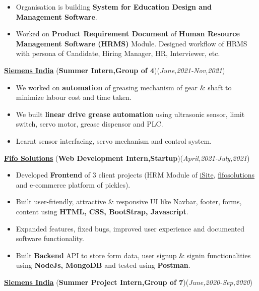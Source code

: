 \documentclass[10pt]{extarticle}
\begin{document}
    \begin{itemize}
       \item Organisation is building \textbf{System for Education Design and Management Software}. 
       \item Worked on \textbf{Product Requirement Document} of \textbf{Human Resource Management Software (HRMS)} Module. Designed workflow of HRMS with persona of Candidate, Hiring Manager, HR, Interviewer, etc.
    \end{itemize}
\vspace{3pt}
\href{https://github.com/PSoni8/Siemens-2021-2022-Internship}{\textbf{Siemens India}} (\textbf{Summer Intern,Group of 4})\hfill\hfill(\textit{June,2021-Nov,2021})
     \begin{itemize}
         \item We worked on \textbf{automation} of greasing mechanism of gear \& shaft to minimize labour cost and time taken.
         \item We built \textbf{linear drive grease automation} using ultrasonic sensor, limit switch, servo motor, grease dispensor and PLC. 
         \item Learnt sensor interfacing, servo mechanism and control system.
     \end{itemize}
\vspace{3pt}
\href{https://github.com/PSoni8/FIFO-Solutions-Internship}{\textbf{Fifo Solutions}} (\textbf{Web Development Intern,Startup})\hfill\hfill(\textit{April,2021-July,2021})
    \begin{itemize}
        \item Developed \textbf{Frontend} of 3 client projects (HRM Module of \href{https://isiteinfo.com/}{iSite}, \href{https://www.fifosolutions.com/}{fifosolutions} and e-commerce platform of pickles).
        \item Built user-friendly, attractive \& responsive UI like Navbar, footer, forms, content using \textbf{HTML, CSS, BootStrap, Javascript}.
        \item Expanded features, fixed bugs, improved user experience and documented software functionality.
        \item Built \textbf{Backend} API to store form data, user signup \& signin functionalities using \textbf{NodeJs, MongoDB} and tested using \textbf{Postman}.
    \end{itemize}
\vspace{3pt}
\href{https://github.com/PSoni8/Automation-in-Hospital-Systems}{\textbf{Siemens India}} (\textbf{Summer Project Intern,Group of 7})\hfill\hfill(\textit{June,2020-Sep,2020})
\end{document}
